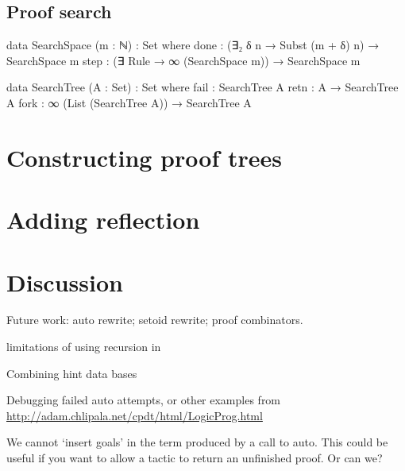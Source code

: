 \documentclass[preprint]{sigplanconf}
\begin{document}
\subsection{Proof search}


\begin{code}
  data SearchSpace (m : ℕ) : Set where
    done : (∃₂ δ n → Subst (m + δ) n) → SearchSpace m
    step : (∃ Rule → ∞ (SearchSpace m)) → SearchSpace m
\end{code}

\begin{code}
  data SearchTree (A : Set) : Set where
    fail : SearchTree A
    retn : A → SearchTree A
    fork : ∞ (List (SearchTree A)) → SearchTree A
\end{code}

 
\section{Constructing proof trees}
\label{sec:proofs}

\section{Adding reflection}
\label{sec:reflection}



\section{Discussion}
\label{sec:discussion}


Future work: auto rewrite; setoid rewrite; proof combinators.

limitations of using recursion in 

Combining hint data bases

Debugging failed auto attempts, or other examples from
\url{http://adam.chlipala.net/cpdt/html/LogicProg.html}

We cannot `insert goals' in the term produced by a call to auto. This
could be useful if you want to allow a tactic to return an unfinished
proof. Or can we?



\end{document}
